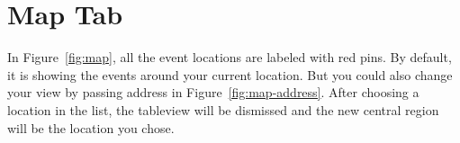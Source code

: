 \section{Map Tab} %
\label{sec:map_tab}

In Figure~\ref{fig:map}, all the event locations are labeled with red pins. By default, it is showing the events around your current location. But you could also change your view by passing address in Figure~\ref{fig:map-address}. After choosing a location in the list, the tableview will be dismissed and the new central region will be the location you chose. 

\begin{figure}
	\centering
	 \hfill

\end{figure}
